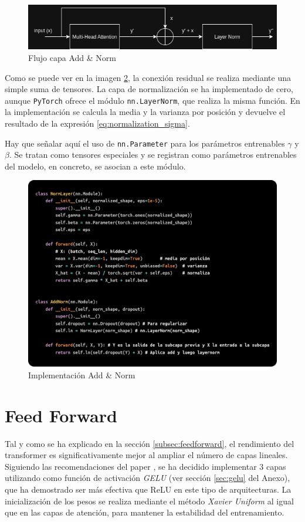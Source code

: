 \documentclass[11pt]{book}
\begin{document}
\begin{figure}[h]
    \centering
    \includegraphics[width=0.5\linewidth]{img/esquema1.png}
    \caption{Flujo capa Add \& Norm}
    \label{fig:placeholder14}
\end{figure}

Como se puede ver en la imagen \ref{fig:placeholder26}, la conexión residual se realiza mediante una simple suma de tensores. La capa de normalización se ha implementado de cero, aunque \texttt{PyTorch} ofrece el módulo \texttt{nn.LayerNorm}, que realiza la misma función. En la implementación se calcula la media y la varianza por posición y devuelve el resultado de la expresión \eqref{eq:normalization_sigma}. 

Hay que señalar aquí el uso de \texttt{nn.Parameter} para los parámetros entrenables $\gamma$ y $\beta$. Se tratan como tensores especiales y se registran como parámetros entrenables del modelo, en concreto, se asocian a este módulo. 

\begin{figure}[h]
    \centering
    \includegraphics[width=0.5\linewidth]{img/add_norm.png}
    \caption{Implementación Add \& Norm}
    \label{fig:placeholder26}
\end{figure}

\section{Feed Forward} 
Tal y como se ha explicado en la sección \ref{subsec:feedforward}, el rendimiento del transformer es significativamente mejor al ampliar el número de capas lineales. Siguiendo las recomendaciones del paper \parencite{gerber2025ffn}, se ha decidido implementar 3 capas utilizando como función de activación \textit{GELU} (ver sección \ref{sec:gelu} del Anexo), que ha demostrado ser más efectiva que ReLU en este tipo de arquitecturas. La inicialización de los pesos se realiza mediante el método \textit{Xavier Uniform} al igual que en las capas de atención, para mantener la estabilidad del entrenamiento.
\end{document}
